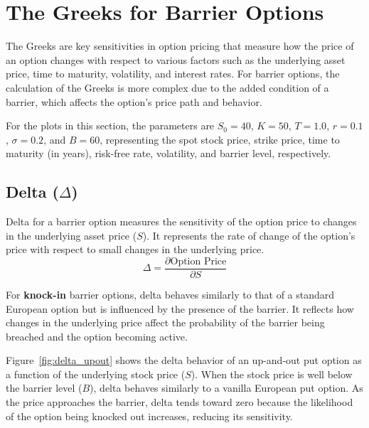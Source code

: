 \chapter{The Greeks for Barrier Options}
\label{sec:greeks}

The Greeks are key sensitivities in option pricing that measure how the price of an option changes with respect to various factors such as the underlying asset price, time to maturity, volatility, and interest rates. For barrier options, the calculation of the Greeks is more complex due to the added condition of a barrier, which affects the option's price path and behavior.

For the plots in this section, the parameters are \( S_0 = 40 \), \( K = 50 \), \( T = 1.0 \), \( r = 0.1 \), \( \sigma = 0.2 \), and \( B = 60 \), representing the spot stock price, strike price, time to maturity (in years), risk-free rate, volatility, and barrier level, respectively.




\section{Delta (\(\Delta\))}

Delta for a barrier option measures the sensitivity of the option price to changes in the underlying asset price (\(S\)). It represents the rate of change of the option's price with respect to small changes in the underlying price.
\[
\Delta = \frac{\partial \text{Option Price}}{\partial S}
\]

For \textbf{knock-in} barrier options, delta behaves similarly to that of a standard European option but is influenced by the presence of the barrier. It reflects how changes in the underlying price affect the probability of the barrier being breached and the option becoming active.

Figure~\ref{fig:delta_upout} shows the delta behavior of an up-and-out put option as a function of the underlying stock price (\(S\)). When the stock price is well below the barrier level (\(B\)), delta behaves similarly to a vanilla European put option. As the price approaches the barrier, delta tends toward zero because the likelihood of the option being knocked out increases, reducing its sensitivity.

